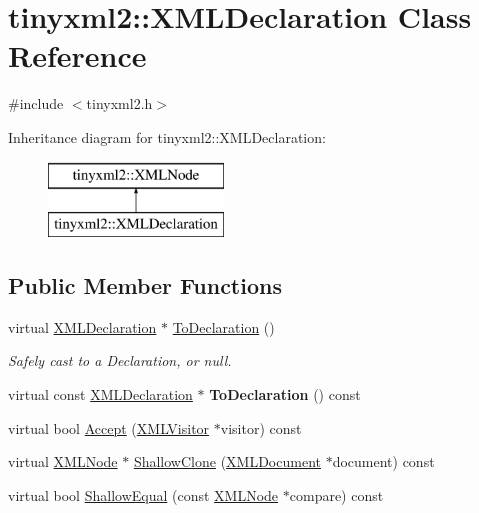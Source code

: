 \hypertarget{classtinyxml2_1_1_x_m_l_declaration}{}\section{tinyxml2\+::X\+M\+L\+Declaration Class Reference}
\label{classtinyxml2_1_1_x_m_l_declaration}


{\ttfamily \#include $<$tinyxml2.\+h$>$}

Inheritance diagram for tinyxml2\+::X\+M\+L\+Declaration\+:\begin{figure}[H]
\begin{center}
\leavevmode
\includegraphics[height=2.000000cm]{classtinyxml2_1_1_x_m_l_declaration}
\end{center}
\end{figure}
\subsection*{Public Member Functions}
\begin{DoxyCompactItemize}
\item 
\mbox{\label{classtinyxml2_1_1_x_m_l_declaration_a159d8ac45865215e88059ea1e5b52fc5}} 
virtual \mbox{\hyperlink{classtinyxml2_1_1_x_m_l_declaration}{X\+M\+L\+Declaration}} $\ast$ \mbox{\hyperlink{classtinyxml2_1_1_x_m_l_declaration_a159d8ac45865215e88059ea1e5b52fc5}{To\+Declaration}} ()
\begin{DoxyCompactList}\small\item\em Safely cast to a Declaration, or null. \end{DoxyCompactList}\item 
\mbox{\label{classtinyxml2_1_1_x_m_l_declaration_aa20c3315b18c3b88830dccf5c493259b}} 
virtual const \mbox{\hyperlink{classtinyxml2_1_1_x_m_l_declaration}{X\+M\+L\+Declaration}} $\ast$ {\bfseries To\+Declaration} () const
\item 
virtual bool \mbox{\hyperlink{classtinyxml2_1_1_x_m_l_declaration_acf47629d9fc08ed6f1c164a97bcf794b}{Accept}} (\mbox{\hyperlink{classtinyxml2_1_1_x_m_l_visitor}{X\+M\+L\+Visitor}} $\ast$visitor) const
\item 
virtual \mbox{\hyperlink{classtinyxml2_1_1_x_m_l_node}{X\+M\+L\+Node}} $\ast$ \mbox{\hyperlink{classtinyxml2_1_1_x_m_l_declaration_ad9d60e6d2df75c13eb6bf7319985b747}{Shallow\+Clone}} (\mbox{\hyperlink{classtinyxml2_1_1_x_m_l_document}{X\+M\+L\+Document}} $\ast$document) const
\item 
virtual bool \mbox{\hyperlink{classtinyxml2_1_1_x_m_l_declaration_ae8b4d3a399857029f36c322b0801b69c}{Shallow\+Equal}} (const \mbox{\hyperlink{classtinyxml2_1_1_x_m_l_node}{X\+M\+L\+Node}} $\ast$compare) const
\end{DoxyCompactItemize}
